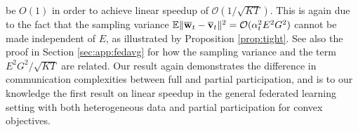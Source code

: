 be $O(1)$ in order to achieve linear speedup of $\mathcal{O}(1/\sqrt{KT})$. {\color{red}This is again due to the fact that the sampling variance $\mathbb{E}\|{\overline{\mathbf{w}}}_t-{\overline{\mathbf{v}}}_t\|^2=\mathcal{O}(\alpha_t^2 E^2G^2)$ cannot be made independent of $E$, as illustrated by Proposition \ref{prop:tight}. See also the proof in Section \ref{sec:app:fedavg} for how the sampling variance and the term $E^2G^2/\sqrt{KT}$ are related.}  Our result again demonstrates the difference in communication complexities
between full and partial participation, and is to our knowledge the
first result on linear speedup in the general federated learning setting
with both heterogeneous data and partial participation for convex objectives.
\begin{comment}
\textbf{Learning rate. }The learning rate now depends on the final
horizon $T$ of the convergence statement, whereas in the strongly
convex case the learning rate decays as $\mathcal{O}(1/t)$. Such
a requirement $\alpha_{t}=\mathcal{O}(\sqrt{N/T})$ also presents
in \cite{haddadpour2019convergence,yu2019parallel} on non-convex
problems with $\mathcal{O}(1/\sqrt{NT})$ linear speedup convergence results. 
\end{comment}
